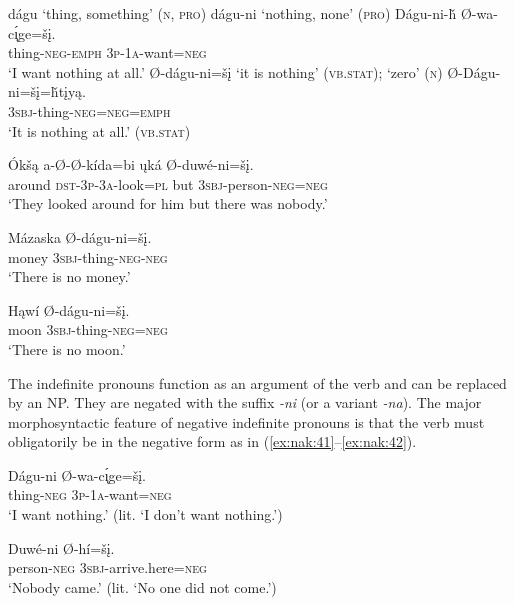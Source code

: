 \documentclass[output=paper,colorlinks,citecolor=brown]{langscibook}
\begin{document}
\ea\label{ex:nak:38}
    \ea\label{ex:nak:38a} dágu ‘thing, something’ (\textsc{n, pro})
    \ex\label{ex:nak:38b} dágu-ni ‘nothing, none’ (\textsc{pro})
    \ex\label{ex:nak:38e}
        \gll Dágu-ni-ȟ Ø-wa-c\'{\k{ı}}ge=šį. \\
             thing-\textsc{neg-emph} \textsc{3p-1a}-want=\textsc{neg} \\
        \glt ‘I want nothing at all.’
    \ex\label{ex:nak:38c} Ø-dágu-ni=šį ‘it is nothing’ (\textsc{vb.stat}); ‘zero’ (\textsc{n})
    \ex\label{ex:nak:38d}
        \gll Ø-Dágu-ni=šį=ȟtįyą. \\
             \textsc{3sbj}-thing-\textsc{neg=neg=emph} \\
        \glt ‘It is nothing at all.’ (\textsc{vb.stat}) 
    
    
    \z
\z

\ea\label{ex:nak:39}
    \gll \'{O}kšą a-Ø-Ø-kída=bi ųká Ø-duwé-ni=šį. \\
         around \textsc{dst-3p-3a}-look=\textsc{pl} but \textsc{3sbj}-person-\textsc{neg=neg} \\
    \glt ‘They looked around for him but there was nobody.’
\z 

\ea\label{ex:nak:40}
    \ea\label{ex:nak:40a}
        \gll Mázaska Ø-dágu-ni=šį. \\
             money \textsc{3sbj}-thing-\textsc{neg-neg} \\
        \glt ‘There is no money.’
    
    \ex\label{ex:nak:40b}
        \gll Hąwí Ø-dágu-ni=šį. \\
             moon \textsc{3sbj}-thing-\textsc{neg=neg} \\
        \glt ‘There is no moon.’
    \z
\z 

The indefinite pronouns function as an argument of the verb and can be replaced by an NP. They are negated with the suffix \textit{-ni} (or a variant \textit{-na}). The major morphosyntactic feature of negative indefinite pronouns is that the verb must obligatorily be in the negative form as in (\ref{ex:nak:41}--\ref{ex:nak:42}).


\ea\label{ex:nak:41}
    \gll Dágu-ni Ø-wa-c\'{\k{ı}}ge=šį. \\
         thing-\textsc{neg} \textsc{3p-1a}-want=\textsc{neg} \\
    \glt ‘I want nothing.’ (lit. ‘I don’t want nothing.’) 
\z 

\ea\label{ex:nak:42}
    \gll Duwé-ni Ø-hí=šį. \\
         person-\textsc{neg} \textsc{3sbj}-arrive.here=\textsc{neg} \\
    \glt ‘Nobody came.’ (lit. ‘No one did not come.’) 
\z 
\end{document}

